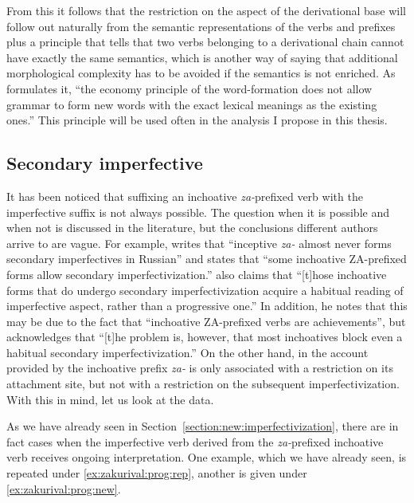 From this it follows that the restriction on the aspect of the derivational base will follow out naturally from the semantic representations of the verbs and prefixes plus a principle that tells that two verbs belonging to a derivational chain cannot have exactly the same semantics, which is another way of saying that additional morphological complexity has to be avoided if the semantics is not enriched. As \citet{Braginsky:08} formulates it, ``the economy principle of the word-formation does not allow grammar to form new words with the
exact lexical meanings as the existing ones.'' This principle will be used often in the analysis I propose in this thesis.


\subsection{Secondary imperfective}
It has been noticed that suffixing an inchoative \textit{za-}prefixed verb with the imperfective suffix is not always possible. The question when it is possible and when not is discussed in the literature, but the conclusions different authors arrive to are vague. For example, \citet[230]{Svenonius:04b} writes that ``inceptive \textit{za-} almost never forms secondary imperfectives in Russian'' and \citet[220]{Braginsky:08} states that ``some inchoative ZA-prefixed forms allow secondary imperfectivization.'' \citet[231]{Braginsky:08} also claims that ``[t]hose inchoative forms that do undergo secondary imperfectivization acquire a habitual reading of imperfective aspect, rather than a progressive one.'' In addition, he notes that this may be due to the fact that ``inchoative ZA-prefixed verbs are achievements'', but acknowledges that ``[t]he problem is, however, that most inchoatives block even a habitual secondary imperfectivization.'' On the other hand, in the account provided by \citet{Tatevosov:09} the inchoative prefix \textit{za-} is only associated with a restriction on its attachment site, but not with a restriction on the subsequent imperfectivization. With this in mind, let us look at the data. 

As we have already seen in Section~\ref{section:new:imperfectivization}, there are in fact cases when the imperfective verb derived from the \textit{za-}prefixed inchoative verb receives ongoing interpretation. One example, which we have already seen, is repeated under \ref{ex:zakurival:prog:rep}, another is given under \ref{ex:zakurival:prog:new}.

